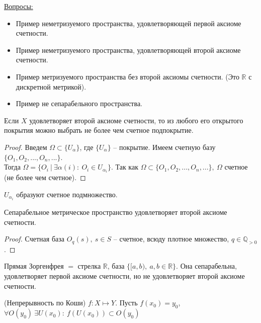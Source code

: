 \underline{Вопросы:}
\begin{itemize}
    \item Пример неметризуемого пространства, удовлетворяющей первой аксиоме счетности.
    \item Пример неметризуемого пространства, удовлетворяющей второй аксиоме счетности.
    \item Пример метризуемого пространства без второй аксиомы счетности. (Это $\mathbb{R}$ с дискретной метрикой).
    \item Пример не сепарабельного пространства.
\end{itemize}

\begin{theorem}[Линделёфа]
    Если $X$ удовлетворяет второй аксиоме счетности, то из любого его открытого покрытия можно выбрать не более чем счетное подпокрытие.
\end{theorem}
\begin{proof}
    Введем $\Omega \subset \{U_\alpha\}$, где $\{U_\alpha\}$ -- покрытие. Имеем счетную базу $\{O_1, O_2,...,O_n,...\}$.\\ Тогда $\Omega = \{O_i\ |\ \exists \alpha(i):\ O_i \in U_{\alpha_i}\}$. Так как $\Omega \subset \{O_1, O_2,...,O_n,...\},\ \Omega$ счетное (не более чем счетное).
\end{proof}

\begin{statement}
    $U_{\alpha_i}$ образуют счетное подмножество.
\end{statement}

\begin{theorem}
    Сепарабельное метрическое пространство удовлетворяет второй аксиоме счетности.
\end{theorem}
\begin{proof}
    Счетная база $O_q(s),\ s \in S$ -- счетное, всюду плотное множество, $q \in \mathbb{Q}_{>0}$. 
\end{proof}

\begin{example}
    Прямая Зоргенфрея $=$ стрелка $\mathbb{R}$, база $\{[a, b),\ a,b \in \mathbb{R}\}$. Она сепарабельна, удовлетворяет первой аксиоме счетности, но не удовлетворяет второй аксиоме счетности.
\end{example}

\begin{definition}
    (Непрерывность по Коши) $f: X \mapsto Y$. Пусть $f(x_0) = y_0$, $\forall O(y_0)\ \exists U(x_0):\ f(U(x_0)) \subset O(y_0)$
\end{definition}

